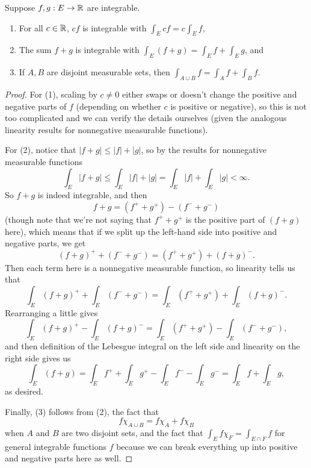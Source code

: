 \begin{proposition}
Suppose $f, g: E \to \mathbb R$ are integrable. \begin{enumerate}
\item For all $c \in \mathbb R$, $cf$ is integrable with $\int_E cf = c\int_E f$, \item The sum $f+g$ is integrable with $\int_E (f+g) = \int_E f + \int_E g$, and 
\item If $A, B$ are disjoint measurable sets, then $\int_{A \cup B} f = \int_A f + \int_B f$.
\end{enumerate}
\end{proposition}
\begin{proof}
For (1), scaling by $c \ne 0$ either swaps or doesn't change the positive and negative parts of $f$ (depending on whether $c$ is positive or negative), so this is not too complicated and we can verify the details ourselves (given the analogous linearity results for nonnegative measurable functions). 

For (2), notice that $|f+g| \le |f| + |g|$, so by the results for nonnegative measurable functions
\[
    \int_E |f+g| \le \int_E |f| + |g| = \int_E |f| + \int_E |g| < \infty.
\]
So $f+g$ is indeed integrable, and then 
\[
    f+g = (f^+ + g^+) - (f^- + g^-)
\]
(though note that we're not saying that $f^+ + g^+$ is the positive part of $(f+g)$ here), which means that if we split up the left-hand side into positive and negative parts, we get 
\[
    (f+g)^+ + (f^- + g^-) = (f^+ + g^+) + (f+g)^-.
\]
Then each term here is a nonnegative measurable function, so linearity tells us that 
\[
    \int_E (f+g)^+ + \int_E (f^- + g^-) = \int_E (f^+ + g^+) + \int_E (f+g)^-.
\]
Rearranging a little gives
\[
    \int_E (f+g)^+ - \int_E (f+g)^- = \int_E (f^+ + g^+) - \int_E (f^- + g^-),
\]
and then definition of the Lebesgue integral on the left side and linearity on the right side gives us 
\[
    \int_E (f+g) = \int_E f^+ + \int_E g^+ - \int_E f^- - \int_E g^- = \int_E f + \int_E g,
\]
as desired. 

Finally, (3) follows from (2), the fact that 
\[
    f \chi_{A \cup B} = f \chi_A + f \chi_B
\]
when $A$ and $B$ are two disjoint sets, and the fact that $\int_E f \chi_F = \int_{E \cap F} f$ for general integrable functions $f$ because we can break everything up into positive and negative parts here as well. 
\end{proof}

